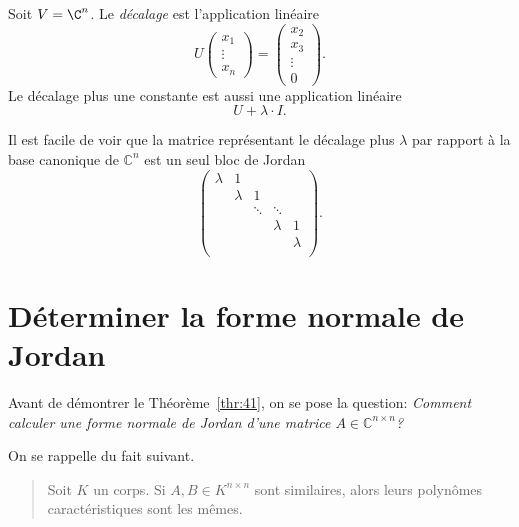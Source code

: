 \begin{definition}
  \label{def:36}
  Soit $V  = \C^n$. Le \emph{décalage}  est l'application linéaire 
  \begin{displaymath}
    U
    \begin{pmatrix}
      x_1 \\ \vdots \\ x_n
    \end{pmatrix}
     = 
     \begin{pmatrix}
       x_2 \\ x_3 \\ \vdots \\ 0
     \end{pmatrix}. 
  \end{displaymath}
  Le décalage plus une constante est aussi une application linéaire 
  \begin{displaymath}
    U + \lambda \cdot I. 
  \end{displaymath}
\end{definition}

Il est facile de voir que la matrice représentant le décalage plus $λ$ par rapport à la base canonique de $\mathbb{C}^n$ est
un seul bloc de Jordan 
\begin{displaymath}
 \begin{pmatrix}
      λ & 1 \\
        & λ & 1 \\
        &   & \ddots & \ddots \\ 
        &   &             & λ & 1 \\
        &   &         &  & λ  \\
    \end{pmatrix}.   
\end{displaymath}




\section{Déterminer la forme normale de Jordan}
\label{sec:determiner-la-forme}

\noindent 
Avant de démontrer le Théorème~\ref{thr:41}, on se pose la question: \emph{Comment calculer une forme normale de Jordan d'une matrice $A ∈ ℂ^{n×n}$?}

On se rappelle du fait suivant.
\begin{quote}
  Soit $K$ un corps. Si $A ,B ∈ K^{n ×n}$ sont similaires, alors leurs polynômes caractéristiques sont les mêmes. 
\end{quote}

